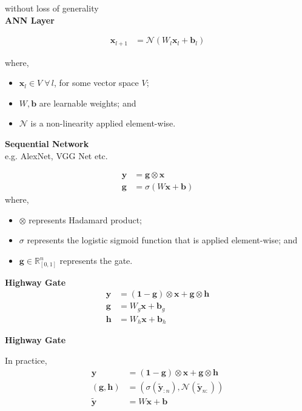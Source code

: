 \documentclass[12pt]{tiet-question-paper}
\begin{document}
{without loss of generality \\[0pt]
\textbf{ANN Layer}

\begin{align*}
  \mathbf{x}_{l+1} &= \mathcal{N}(W_l\mathbf{x}_l +
                     \mathbf{b}_l) 
\end{align*}

where,
\begin{itemize}
\item \(\mathbf{x}_{l}\in V \;\forall\, l\), for some vector space
\(V\);
\item \(W,\mathbf{b}\) are learnable weights; and
\item \(\mathcal{N}\) is a non-linearity applied
element-wise.
\end{itemize}

\textbf{Sequential Network} \\[0pt]
e.g. AlexNet, VGG Net etc.

\newpage

\begin{align*}
  \mathbf{y} &=\mathbf{g} \otimes \mathbf{x} \\
  \mathbf{g} &= \sigma(W\mathbf{x}+\mathbf{b})
\end{align*}
where,
\begin{itemize}
\item \(\otimes\) represents Hadamard product;
\item \(\sigma\) represents the logistic sigmoid function
that is applied element-wise; and
\item \(\mathbf{g}\in\mathbb{R}^n_{[0,1]}\) represents the
gate.
\end{itemize}


\textbf{Highway Gate}
\begin{align*}
  \mathbf{y} &= (\boldsymbol{1} - \mathbf{g}) \otimes
               \mathbf{x} + \mathbf{g} \otimes
               \mathbf{h} \\
  \mathbf{g} &= W_g\mathbf{x}+\mathbf{b}_g \\
  \mathbf{h} &= W_h\mathbf{x}+\mathbf{b}_h
\end{align*}


\textbf{Highway Gate}

In practice,
\begin{align*}
  \mathbf{y} &= (\boldsymbol{1} - \mathbf{g}) \otimes
               \mathbf{x} + \mathbf{g} \otimes
               \mathbf{h} \\
  (\mathbf{g},\mathbf{h})
             &= \left(\sigma
               (\widetilde{\mathbf{y}}_{:n}),
               \mathcal{N}
               (\widetilde{\mathbf{y}}_{n:}) \right) \\
  \widetilde{\mathbf{y}} &= W\mathbf{x}+\mathbf{b} 
\end{align*}

}
\end{document}
